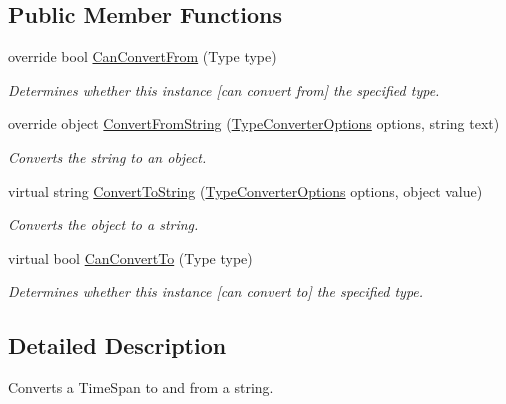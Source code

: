 \subsection*{Public Member Functions}
\begin{DoxyCompactItemize}
\item 
override bool \hyperlink{a00148_ae3f8d46f5176d2ae08ac3fcdda1951e7}{Can\-Convert\-From} (Type type)
\begin{DoxyCompactList}\small\item\em Determines whether this instance \mbox{[}can convert from\mbox{]} the specified type. \end{DoxyCompactList}\item 
override object \hyperlink{a00148_a0f2536c88227a94822d0b7730eedf3eb}{Convert\-From\-String} (\hyperlink{a00154}{Type\-Converter\-Options} options, string text)
\begin{DoxyCompactList}\small\item\em Converts the string to an object. \end{DoxyCompactList}\item 
virtual string \hyperlink{a00068_a36cb2f9b24f15a671293f3a722324c27}{Convert\-To\-String} (\hyperlink{a00154}{Type\-Converter\-Options} options, object value)
\begin{DoxyCompactList}\small\item\em Converts the object to a string. \end{DoxyCompactList}\item 
virtual bool \hyperlink{a00068_acb65bd8c8199d88d5b1629ae35d18514}{Can\-Convert\-To} (Type type)
\begin{DoxyCompactList}\small\item\em Determines whether this instance \mbox{[}can convert to\mbox{]} the specified type. \end{DoxyCompactList}\end{DoxyCompactItemize}


\subsection{Detailed Description}
Converts a Time\-Span to and from a string. 



